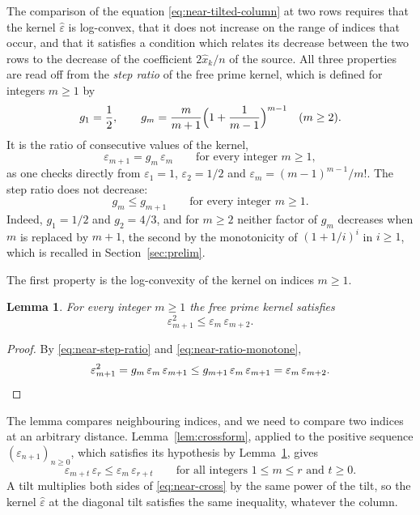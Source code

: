\documentclass{amsart}
\newtheorem{lemma}[theorem]{Lemma}
\theoremstyle{definition}
\theoremstyle{remark}
\numberwithin{equation}{section}
\begin{document}
The comparison of the equation \eqref{eq:near-tilted-column} at two rows
requires that the kernel $\hat\varepsilon$ is log-convex, that it does not
increase on the range of indices that occur, and that it satisfies a condition
which relates its decrease between the two rows to the decrease of the
coefficient $2\hat x_k/n$ of the source. All three properties are read off
from the \emph{step ratio} of the free prime kernel, which is defined for
integers $m\ge1$ by
\[
g_1=\frac12,\qquad
g_m=\frac{m}{m+1}\Bigl(1+\frac{1}{m-1}\Bigr)^{m-1}\quad(m\ge2).
\]
It is the ratio of consecutive values of the kernel,
\begin{equation}\label{eq:near-step-ratio}
\varepsilon_{m+1}=g_m\,\varepsilon_m\qquad\text{for every integer }m\ge1 ,
\end{equation}
as one checks directly from $\varepsilon_1=1$, $\varepsilon_2=1/2$ and
$\varepsilon_m=(m-1)^{m-1}/m!$. The step ratio does not decrease:
\begin{equation}\label{eq:near-ratio-monotone}
g_m\le g_{m+1}\qquad\text{for every integer }m\ge1 .
\end{equation}
Indeed, $g_1=1/2$ and $g_2=4/3$, and for $m\ge2$ neither factor of $g_m$
decreases when $m$ is replaced by $m+1$, the second by the monotonicity of
$(1+1/i)^i$ in $i\ge1$, which is recalled in Section~\ref{sec:prelim}.

The first property is the log-convexity of the kernel on indices $m\ge1$.

\begin{lemma}\label{lem:kernelconvex}
For every integer $m\ge1$ the free prime kernel satisfies
\[
\varepsilon_{m+1}^2\le\varepsilon_m\,\varepsilon_{m+2} .
\]
\end{lemma}

\begin{proof}
By \eqref{eq:near-step-ratio} and \eqref{eq:near-ratio-monotone},
\[
\varepsilon_{m+1}^2=g_m\,\varepsilon_m\,\varepsilon_{m+1}
\le g_{m+1}\,\varepsilon_m\,\varepsilon_{m+1}
=\varepsilon_m\,\varepsilon_{m+2}. \qedhere
\]
\end{proof}

The lemma compares neighbouring indices, and we need to compare two indices
at an arbitrary distance. Lemma~\ref{lem:crossform}, applied to the positive
sequence $(\varepsilon_{n+1})_{n\ge0}$, which satisfies its hypothesis by
Lemma~\ref{lem:kernelconvex}, gives
\begin{equation}\label{eq:near-cross}
\varepsilon_{m+t}\,\varepsilon_r\le\varepsilon_m\,\varepsilon_{r+t}
\qquad\text{for all integers }1\le m\le r\text{ and }t\ge0 .
\end{equation}
A tilt multiplies both sides of \eqref{eq:near-cross} by the same power of
the tilt, so the kernel $\hat\varepsilon$ at the diagonal tilt satisfies the
same inequality, whatever the column.
\end{document}
